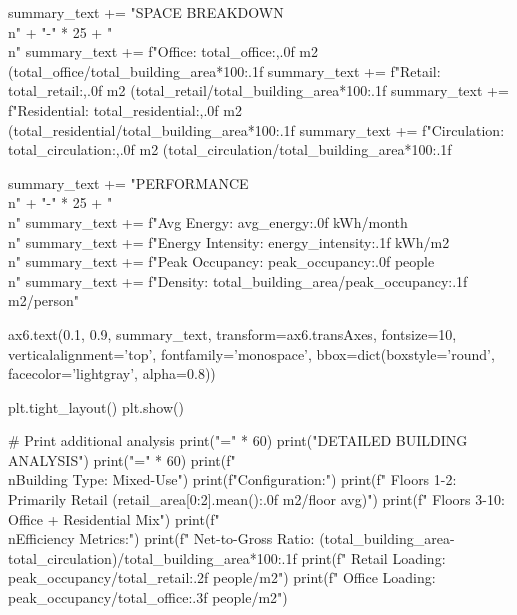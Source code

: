 {    summary_text += "SPACE BREAKDOWN\\n" + "-" * 25 + "\\n"
    summary_text += f"Office: {total_office:,.0f} m2 ({total_office/total_building_area*100:.1f}%
    summary_text += f"Retail: {total_retail:,.0f} m2 ({total_retail/total_building_area*100:.1f}%
    summary_text += f"Residential: {total_residential:,.0f} m2 ({total_residential/total_building_area*100:.1f}%
    summary_text += f"Circulation: {total_circulation:,.0f} m2 ({total_circulation/total_building_area*100:.1f}%
    
    summary_text += "PERFORMANCE\\n" + "-" * 25 + "\\n"
    summary_text += f"Avg Energy: {avg_energy:.0f} kWh/month\\n"
    summary_text += f"Energy Intensity: {energy_intensity:.1f} kWh/m2\\n"
    summary_text += f"Peak Occupancy: {peak_occupancy:.0f} people\\n"
    summary_text += f"Density: {total_building_area/peak_occupancy:.1f} m2/person"
    
    ax6.text(0.1, 0.9, summary_text, transform=ax6.transAxes,
            fontsize=10, verticalalignment='top',
            fontfamily='monospace',
            bbox=dict(boxstyle='round', facecolor='lightgray', alpha=0.8))
    
    plt.tight_layout()
    plt.show()
    
    # Print additional analysis
    print("=" * 60)
    print("DETAILED BUILDING ANALYSIS")
    print("=" * 60)
    print(f"\\nBuilding Type: Mixed-Use")
    print(f"Configuration:")
    print(f"  Floors 1-2: Primarily Retail ({retail_area[0:2].mean():.0f} m2/floor avg)")
    print(f"  Floors 3-10: Office + Residential Mix")
    print(f"\\nEfficiency Metrics:")
    print(f"  Net-to-Gross Ratio: {(total_building_area-total_circulation)/total_building_area*100:.1f}%
    print(f"  Retail Loading: {peak_occupancy/total_retail:.2f} people/m2")
    print(f"  Office Loading: {peak_occupancy/total_office:.3f} people/m2")
    
}
